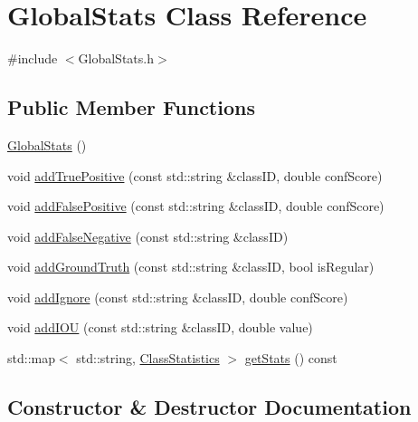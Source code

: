 \hypertarget{class_global_stats}{}\section{Global\+Stats Class Reference}
\label{class_global_stats}


{\ttfamily \#include $<$Global\+Stats.\+h$>$}

\subsection*{Public Member Functions}
\begin{DoxyCompactItemize}
\item 
\hyperlink{class_global_stats_a75c399ee4fa74973ed52cc285cae94e4}{Global\+Stats} ()
\item 
void \hyperlink{class_global_stats_a43e9e950d3ab11dd07f7fe3ca76f91ee}{add\+True\+Positive} (const std\+::string \&class\+ID, double conf\+Score)
\item 
void \hyperlink{class_global_stats_ad3b7ccc1ad4191394357d7280b04d13c}{add\+False\+Positive} (const std\+::string \&class\+ID, double conf\+Score)
\item 
void \hyperlink{class_global_stats_a667d0c7293eadc152d9de17aa1b6d40e}{add\+False\+Negative} (const std\+::string \&class\+ID)
\item 
void \hyperlink{class_global_stats_a2c29f0dbc05606ac58ae49a1dedeef78}{add\+Ground\+Truth} (const std\+::string \&class\+ID, bool is\+Regular)
\item 
void \hyperlink{class_global_stats_a44ef2427549b0eb26c755b0a2e9a5ae9}{add\+Ignore} (const std\+::string \&class\+ID, double conf\+Score)
\item 
void \hyperlink{class_global_stats_a07078ad8a5909da138bb7d0571f461c3}{add\+I\+OU} (const std\+::string \&class\+ID, double value)
\item 
std\+::map$<$ std\+::string, \hyperlink{struct_class_statistics}{Class\+Statistics} $>$ \hyperlink{class_global_stats_a2a98ea3959dc7e104122a7839e6249fe}{get\+Stats} () const
\end{DoxyCompactItemize}


\subsection{Constructor \& Destructor Documentation}
\mbox{\label{class_global_stats_a75c399ee4fa74973ed52cc285cae94e4}} 

